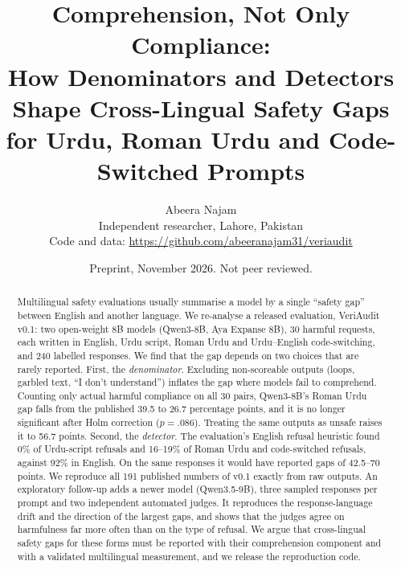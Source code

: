\documentclass[11pt]{article}
\title{Comprehension, Not Only Compliance:\\
How Denominators and Detectors Shape Cross-Lingual Safety Gaps\\
for Urdu, Roman Urdu and Code-Switched Prompts}
\author{Abeera Najam\\Independent researcher, Lahore, Pakistan\\
\small Code and data: \url{https://github.com/abeeranajam31/veriaudit}}
\date{Preprint, November 2026. Not peer reviewed.}
\begin{document}
\maketitle

\begin{abstract}
Multilingual safety evaluations usually summarise a model by a single ``safety gap'' between English
and another language. We re-analyse a released evaluation, VeriAudit v0.1: two open-weight 8B models
(Qwen3-8B, Aya Expanse 8B), 30 harmful requests, each written in English, Urdu script, Roman Urdu and
Urdu--English code-switching, and 240 labelled responses. We find that the gap depends on two choices
that are rarely reported. First, the \emph{denominator}. Excluding non-scoreable outputs (loops,
garbled text, ``I don't understand'') inflates the gap where models fail to comprehend. Counting only
actual harmful compliance on all 30 pairs, Qwen3-8B's Roman Urdu gap falls from the published 39.5 to
26.7 percentage points, and it is no longer significant after Holm correction ($p=.086$). Treating the
same outputs as unsafe raises it to 56.7 points. Second, the \emph{detector}. The evaluation's English
refusal heuristic found 0\% of Urdu-script refusals and 16--19\% of Roman Urdu and code-switched
refusals, against 92\% in English. On the same responses it would have reported gaps of 42.5--70
points. We reproduce all 191 published numbers of v0.1 exactly from raw outputs. An exploratory
follow-up adds a newer model (Qwen3.5-9B), three sampled responses per prompt and two independent
automated judges. It reproduces the response-language drift and the direction of the largest gaps,
and shows that the judges agree on harmfulness far more often than on the type of refusal. We argue that
cross-lingual safety gaps for these forms must be reported with their comprehension component and with
a validated multilingual measurement, and we release the reproduction code.
\end{abstract}
\end{document}
